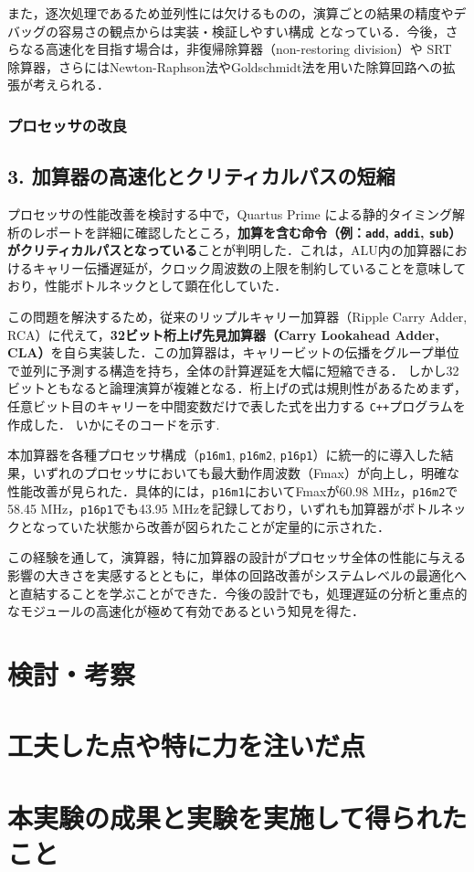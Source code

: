 \documentclass[autodetect-engine,dvi=dvipdfmx,ja=standard,
               a4j,11pt]{bxjsarticle}
\begin{document}
また，逐次処理であるため並列性には欠けるものの，演算ごとの結果の精度やデバッグの容易さの観点からは実装・検証しやすい構成
となっている．今後，さらなる高速化を目指す場合は，非復帰除算器（non-restoring division）や 
SRT 除算器，さらにはNewton-Raphson法やGoldschmidt法を用いた除算回路への拡張が考えられる．
\subsubsection{プロセッサの改良}
\subsection*{3. 加算器の高速化とクリティカルパスの短縮}

プロセッサの性能改善を検討する中で，Quartus Prime による静的タイミング解析のレポートを詳細に確認したところ，\textbf{加算を含む命令（例：\texttt{add}, \texttt{addi}, \texttt{sub}）がクリティカルパスとなっている}ことが判明した．これは，ALU内の加算器におけるキャリー伝播遅延が，クロック周波数の上限を制約していることを意味しており，性能ボトルネックとして顕在化していた．

この問題を解決するため，従来のリップルキャリー加算器（Ripple Carry Adder, RCA）に代えて，\textbf{32ビット桁上げ先見加算器（Carry Lookahead Adder, CLA）}を自ら実装した．この加算器は，キャリービットの伝播をグループ単位で並列に予測する構造を持ち，全体の計算遅延を大幅に短縮できる．
しかし32ビットともなると論理演算が複雑となる．桁上げの式は規則性があるためまず，任意ビット目のキャリーを中間変数だけで表した式を出力する
\verb|C++|プログラムを作成した．
いかにそのコードを示す.


本加算器を各種プロセッサ構成（\texttt{p16m1}, \texttt{p16m2}, \texttt{p16p1}）に統一的に導入した結果，いずれのプロセッサにおいても最大動作周波数（Fmax）が向上し，明確な性能改善が見られた．具体的には，\texttt{p16m1}においてFmaxが60.98 MHz，\texttt{p16m2}で58.45 MHz，\texttt{p16p1}でも43.95 MHzを記録しており，いずれも加算器がボトルネックとなっていた状態から改善が図られたことが定量的に示された．

この経験を通して，演算器，特に加算器の設計がプロセッサ全体の性能に与える影響の大きさを実感するとともに，単体の回路改善がシステムレベルの最適化へと直結することを学ぶことができた．今後の設計でも，処理遅延の分析と重点的なモジュールの高速化が極めて有効であるという知見を得た．



\section{検討・考察}
\section{工夫した点や特に力を注いだ点}
\section{本実験の成果と実験を実施して得られたこと}
\end{document}
